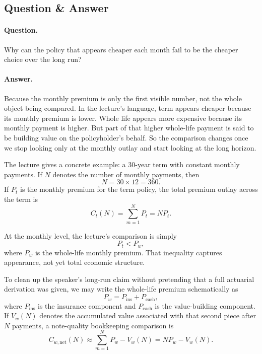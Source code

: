 \subsection{Question \& Answer}

\paragraph{Question.} Why can the policy that appears cheaper each month fail to be the cheaper choice over the long run?

\paragraph{Answer.} Because the monthly premium is only the first visible number, not the whole object being compared. In the lecture's language, term appears cheaper because its monthly premium is lower. Whole life appears more expensive because its monthly payment is higher. But part of that higher whole-life payment is said to be building value on the policyholder's behalf. So the comparison changes once we stop looking only at the monthly outlay and start looking at the long horizon.

The lecture gives a concrete example: a \(30\)-year term with constant monthly payments. If \(N\) denotes the number of monthly payments, then
\begin{equation}
N = 30 \times 12 = 360.
\end{equation}
If \(P_t\) is the monthly premium for the term policy, the total premium outlay across the term is
\begin{equation}
C_t(N) = \sum_{m=1}^{N} P_t = NP_t.
\end{equation}

At the monthly level, the lecture's comparison is simply
\begin{equation}
P_t < P_w,
\end{equation}
where \(P_w\) is the whole-life monthly premium. That inequality captures appearance, not yet total economic structure.

To clean up the speaker's long-run claim without pretending that a full actuarial derivation was given, we may write the whole-life premium schematically as
\begin{equation}
P_w = P_{\mathrm{ins}} + P_{\mathrm{cash}},
\end{equation}
where \(P_{\mathrm{ins}}\) is the insurance component and \(P_{\mathrm{cash}}\) is the value-building component. If \(V_w(N)\) denotes the accumulated value associated with that second piece after \(N\) payments, a note-quality bookkeeping comparison is
\begin{equation}
C_{w,\mathrm{net}}(N) \approx \sum_{m=1}^{N} P_w - V_w(N) = NP_w - V_w(N).
\end{equation}

